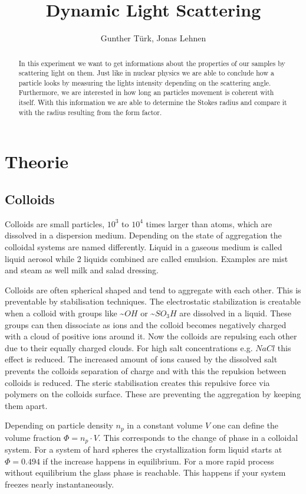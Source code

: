 \documentclass[]{article}
\title{Dynamic Light Scattering}
\author{Gunther T\"urk, Jonas Lehnen}
\begin{document}
\maketitle
\begin{abstract}
In this experiment we want to get informations about the properties of our samples by scattering light on them. Just like in nuclear physics we are able to conclude how a particle looks by measuring the lights intensity depending on the scattering angle. Furthermore, we are interested in how long an particles movement is coherent with itself. With this information we are able to determine the Stokes radius and compare it with the radius resulting from the form factor.

\end{abstract}

\tableofcontents


\section{Theorie}
\subsection{Colloids}
Colloids are small particles, $10^3$ to $10^4$ times larger than  atoms, which are dissolved in a dispersion medium. Depending on the state of aggregation the colloidal systems are named differently. Liquid in a gaseous medium is called liquid aerosol while 2 liquids combined are called emulsion. Examples are mist and steam as well milk and salad dressing.


Colloids are often spherical shaped and tend to aggregate with each other. This is preventable by stabilisation techniques. The electrostatic stabilization is creatable when a colloid with groups like \textasciitilde$OH$ or \textasciitilde$SO_3H$ are dissolved in a liquid. These groups  can then dissociate as ions and the colloid becomes negatively charged with a cloud of positive ions around it. Now the colloids are repulsing each other due to their equally charged clouds. For high salt concentrations e.g. $NaCl$ this effect is reduced. The increased amount of ions caused by the dissolved salt prevents the colloids separation of charge and with this the repulsion between colloids is reduced. 
The steric stabilisation creates this repulsive force via polymers on the colloids surface. These are preventing the aggregation by keeping them apart.

Depending on particle density $n_p$ in a constant volume $V$ one can define the volume fraction $\Phi = n_p \cdot V$. This corresponds to the change of phase in a colloidal system. For a system of hard spheres the crystallization form liquid starts at $\Phi=0.494$ if the increase happens in equilibrium. For a more rapid process without equilibrium the glass phase is reachable. This happens if your system freezes nearly instantaneously.  
\end{document}
